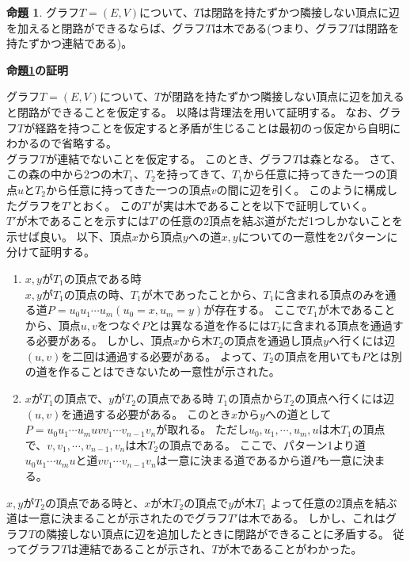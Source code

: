 \documentclass[uplatex,dvipdfmx,a4paper,10pt]{jsarticle}
\makeatletter
\theoremstyle{definition}
\newtheorem{prop}[thm]{命題}
\renewenvironment{proof}[1][\proofname]{\par
  \pushQED{\qed}%
  \normalfont \topsep6\p@\@plus6\p@\relax
  \trivlist
  \item\relax
  {\bfseries
  #1\@addpunct{.}}\hspace\labelsep\ignorespaces
}{%
  \popQED\endtrivlist\@endpefalse
}
\makeatother
\begin{document}
\begin{prop}
グラフ\(T = (E, V)\)について、\(T\)は閉路を持たずかつ隣接しない頂点に辺を加えると閉路ができるならば、グラフ\(T\)は木である(つまり、グラフ\(T\)は閉路を持たずかつ連結である)。
\label{prop_six_to_one}
\end{prop}

\begin{proof}[\textbf{命題\ref{prop_six_to_one}の証明}]
グラフ\(T = (E, V)\)について、\(T\)が閉路を持たずかつ隣接しない頂点に辺を加えると閉路ができることを仮定する。
以降は背理法を用いて証明する。
なお、グラフ\(T\)が経路を持つことを仮定すると矛盾が生じることは最初のっ仮定から自明にわかるので省略する。 \\
\hspace{1em}グラフ\(T\)が連結でないことを仮定する。
このとき、グラフ\(T\)は森となる。
さて、この森の中から2つの木\(T_1\)、\(T_2\)を持ってきて、\(T_1\)から任意に持ってきた一つの頂点\(u\)と\(T_2\)から任意に持ってきた一つの頂点\(v\)の間に辺を引く。
このように構成したグラフを\(T'\)とおく。
この\(T'\)が実は木であることを以下で証明していく。\\
\hspace{1em}\(T'\)が木であることを示すには\(T'\)の任意の2頂点を結ぶ道がただ1つしかないことを示せば良い。
以下、頂点\(x\)から頂点\(y\)への道\(x, y\)についての一意性を2パターンに分けて証明する。
\begin{enumerate}
  \item \(x, y\)が\(T_1\)の頂点である時 \\
        \hspace{1em}\(x, y\)が\(T_1\)の頂点の時、\(T_1\)が木であったことから、\(T_1\)に含まれる頂点のみを通る道\(P = u_0 u_1 \cdots u_m (u_0 = x, u_m = y)\)が存在する。
        ここで\(T_1\)が木であることから、頂点\(u, v\)をつなぐ\(P\)とは異なる道を作るには\(T_2\)に含まれる頂点を通過する必要がある。
        しかし、頂点\(x\)から木\(T_2\)の頂点を通過し頂点\(y\)へ行くには辺\((u, v)\)を二回は通過する必要がある。
        よって、\(T_2\)の頂点を用いても\(P\)とは別の道を作ることはできないため一意性が示された。
  \item \hspace{1em}\(x\)が\(T_1\)の頂点で、\(y\)が\(T_2\)の頂点である時
        \hspace{1em}\(T_1\)の頂点から\(T_2\)の頂点へ行くには辺\((u, v)\)を通過する必要がある。
        このとき\(x\)から\(y\)への道として\(P = u_0 u_1 \cdots u_m u v v_1 \cdots v_{n-1} v_n\)が取れる。
        ただし\(u_0, u_1, \cdots, u_m, u\)は木\(T_1\)の頂点で、\(v, v_1, \cdots, v_{n-1}, v_n\)は木\(T_2\)の頂点である。
        ここで、パターン1より道\(u_0 u_1 \cdots u_m u\)と道\(v v_1 \cdots v_{n-1} v_n\)は一意に決まる道であるから道\(P\)も一意に決まる。
\end{enumerate}
\hspace{1em}\(x, y\)が\(T_2\)の頂点である時と、\(x\)が木\(T_2\)の頂点で\(y\)が木\(T_1\)
よって任意の2頂点を結ぶ道は一意に決まることが示されたのでグラフ\(T'\)は木である。
しかし、これはグラフ\(T\)の隣接しない頂点に辺を追加したときに閉路ができることに矛盾する。
従ってグラフ\(T\)は連結であることが示され、\(T\)が木であることがわかった。
\end{proof}
\end{document}
